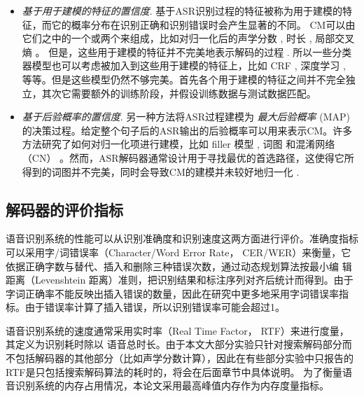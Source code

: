 \begin{itemize}
    \item {\em 基于用于建模的特征的置信度}.
    基于ASR识别过程的特征被称为用于建模的特征，而它的概率分布在识别正确和识别错误时会产生显著的不同。
    CM可以由它们之中的一个或两个来组成，比如对归一化后的声学分数 \cite{hu2013new}, 时长 \cite{ma2011fusing}, 局部交叉熵 \cite{falavigna2002acoustic}。
    但是，这些用于建模的特征并不完美地表示解码的过程 \cite{jiang2005confidence}. 所以一些分类器模型也可以考虑被加入到这些用于建模的特征上，比如 CRF \cite{seigel2013confidence}, 深度学习 \cite{yu2011calibration}, 等等。但是这些模型仍然不够完美。首先各个用于建模的特征之间并不完全独立，其次它需要额外的训练阶段，并假设训练数据与测试数据匹配。

    \item {\em 基于后验概率的置信度}.
    另一种方法将ASR过程建模为 {\em 最大后验概率} (MAP) 的决策过程。给定整个句子后的ASR输出的后验概率可以用来表示CM。许多方法研究了如何对归一化项进行建模，比如 filler 模型 \cite{young1994detecting}, 词图\cite{wessel2001confidence} 和混淆网络（CN） \cite{evermann2000large}。然而，ASR解码器通常设计用于寻找最优的首选路径，这使得它所得到的词图并不完美，同时会导致CM的建模并未较好地归一化 \cite{yu2006maximum}.

\end{itemize}


\subsection{解码器的评价指标}
\label{chap:intro-lvcsr-criterion}
语音识别系统的性能可以从识别准确度和识别速度这两方面进行评价。准确度指标可以采用字/词错误率（Character/Word Error Rate， CER/WER）来衡量，它依据正确字数与替代、插入和删除三种错误次数，通过动态规划算法按最小编
辑距离（Levenshtein 距离）准则，把识别结果和标注序列对齐后统计而得到。由于字词正确率不能反映出插入错误的数量，因此在研究中更多地采用字词错误率指标。由于错误率计算了插入错误，所以识别错误率可能会超过1。

语音识别系统的速度通常采用实时率（Real Time Factor， RTF）来进行度量，其定义为识别耗时除以
语音总时长。由于本文大部分实验只针对搜索解码部分而不包括解码器的其他部分（比如声学分数计算），因此在有些部分实验中只报告的RTF是只包括搜索解码算法的耗时的，将会在后面章节中具体说明。
为了衡量语音识别系统的内存占用情况，本论文采用最高峰值内存作为内存度量指标。

